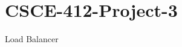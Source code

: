 \chapter{CSCE-\/412-\/\+Project-\/3}
\hypertarget{md__r_e_a_d_m_e}{}\label{md__r_e_a_d_m_e}
\label{md__r_e_a_d_m_e_autotoc_md0}%
%
Load Balancer 